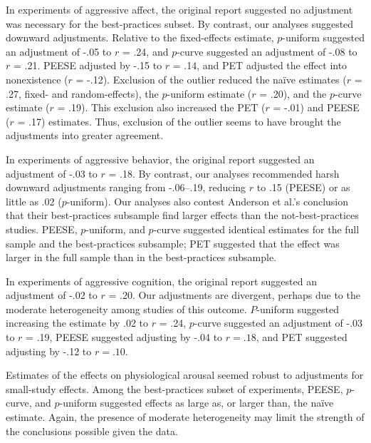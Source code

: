 \documentclass[man, mask]{apa6}
\begin{document}
In experiments of aggressive affect, the original report suggested no adjustment was necessary for the best-practices subset. By contrast, our analyses suggested downward adjustments. Relative to the fixed-effects estimate, $p$-uniform suggested an adjustment of -.05 to $r$ = .24, and $p$-curve suggested an adjustment of -.08 to $r$ = .21. PEESE adjusted by -.15 to $r$ = .14, and PET adjusted the effect into nonexistence ($r$ = -.12). Exclusion of the outlier \citet{Ballard:Wiest:1996} reduced the na{\"i}ve estimates ($r$ = .27, fixed- and random-effects), the $p$-uniform estimate ($r$ = .20), and the $p$-curve estimate ($r$ = .19). This exclusion also increased the PET ($r$ = -.01) and PEESE ($r$ = .17) estimates. Thus, exclusion of the outlier seems to have brought the adjustments into greater agreement.

In experiments of aggressive behavior, the original report suggested an adjustment of -.03 to $r$ = .18. By contrast, our analyses recommended harsh downward adjustments ranging from -.06--.19, reducing $r$ to .15 (PEESE) or as little as .02 ($p$-uniform). Our analyses also contest Anderson et al.'s conclusion that their best-practices subsample find larger effects than the not-best-practices studies. PEESE, $p$-uniform, and $p$-curve suggested identical estimates for the full sample and the best-practices subsample; PET suggested that the effect was larger in the full sample than in the best-practices subsample. 

In experiments of aggressive cognition, the original report suggested an adjustment of -.02 to $r$ = .20. Our adjustments are divergent, perhaps due to the moderate heterogeneity among studies of this outcome. $P$-uniform suggested increasing the estimate by .02 to $r$ = .24, $p$-curve suggested an adjustment of -.03 to $r$ = .19, PEESE suggested adjusting by -.04 to $r = .18$, and PET suggested adjusting by -.12 to $r = .10$.

Estimates of the effects on physiological arousal seemed robust to adjustments for small-study effects. Among the best-practices subset of experiments, PEESE, $p$-curve, and $p$-uniform suggested effects as large as, or larger than, the na{\"i}ve estimate. Again, the presence of moderate heterogeneity may limit the strength of the conclusions possible given the data.
\end{document}
